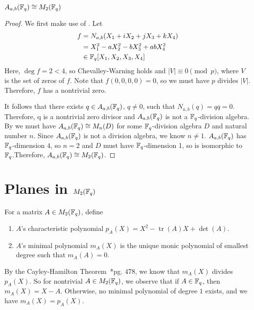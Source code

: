 \documentclass{amsart}
\begin{document}
\begin{theorem}
    $A_{a,b}(\protect\mathbb{F}_q) \cong M_2(\protect\mathbb{F}_q)$ 
\end{theorem}
\begin{proof}
    We first make use of . Let
    \begin{align*}
        f &= N_{a,b}(X_1 + iX_2 + jX_3 + kX_4) \\
            &= X_1^2 -aX_2^2 -bX_3^2 + abX_4^2 \\
            &\in \protect\mathbb{F}_q[X_1, X_2, X_3, X_4]
    \end{align*}
    Here, $\deg f = 2 < 4$, so Chevalley-Warning holds and $|V| \equiv 0 \pmod{p}$, where $V$ is the set of zeros of $f$. Note that $f(0,0,0,0) = 0$, so we must have $p$ divides $|V|$. Therefore, $f$ has a nontrivial zero.

    It follows that there exists $q \in A_{a,b}(\protect\mathbb{F}_q)$, $q \neq 0$, such that $N_{a,b}(q) = q \overline{q} = 0$. Therefore, q is a nontrivial zero divisor and $A_{a,b}(\protect\mathbb{F}_q)$ is not a $\protect\mathbb{F}_q$-division algebra. By  we must have $A_{a,b}(\protect\mathbb{F}_q) \cong M_n(D)$ for some $\protect\mathbb{F}_q$-division algebra $D$ and natural number $n$. Since $A_{a,b}(\protect\mathbb{F}_q)$ is not a division algebra, we know $n\neq1$. $A_{a,b}(\protect\mathbb{F}_q)$ has $\protect\mathbb{F}_q$-dimension $4$, so $n = 2$ and $D$ must have $\protect\mathbb{F}_q$-dimension 1, so is isomorphic to $\protect\mathbb{F}_q$.Therefore, $A_{a,b}(\protect\mathbb{F}_q) \cong M_2(\protect\mathbb{F}_q)$. 
\end{proof}

\section{Planes in $M_2(\protect\mathbb{F}_q)$}
    \begin{defn}
        For a matrix $A \in M_2(\protect\mathbb{F}_q)$, define
        \begin{enumerate}
            \item $A$'s characteristic polynomial $p_A(X) = X^2 -\operatorname{tr}(A)X + \det(A)$.
            \item $A$'s minimal polynomial $m_A(X)$ is the unique monic polynomial of smallest degree such that $m_A(A) = 0$.
        \end{enumerate}
    \end{defn}

    By the Cayley-Hamilton Theorem~\cite{DandF}*{pg. 478}, we know that $m_A(X)$ divides $p_A(X)$. So for nontrivial $A \in M_2(\protect\mathbb{F}_q)$, we observe that if $A \in \protect\mathbb{F}_q$, then $m_A(X) = X - A$. Otherwise, no minimal polynomial of degree $1$ exists, and we have $m_A(X) = p_A(X)$. 
\end{document}
